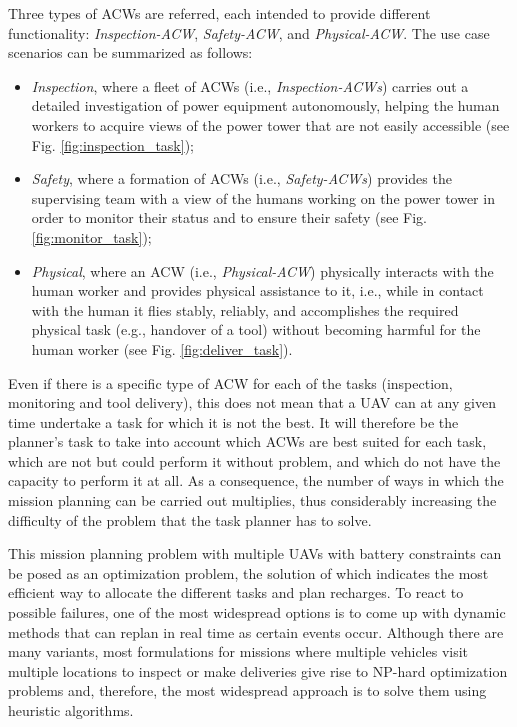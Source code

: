 Three types of \glspl{ACW} are referred, each intended to provide different functionality: \textit{Inspection-ACW}, \textit{Safety-ACW}, and \textit{Physical-ACW}. The use case scenarios can be summarized as follows: 

\begin{itemize}
    \item \textit{Inspection}, where a fleet of \glspl{ACW} (i.e., \textit{Inspection-ACWs}) carries out a detailed investigation of power equipment autonomously, helping the human workers to acquire views of the power tower that are not easily accessible (see Fig. \ref{fig:inspection_task});
    \item \textit{Safety}, where a formation of \glspl{ACW} (i.e., \textit{Safety-ACWs}) provides the supervising team with a view of the humans working on the power tower in order to monitor their status and to ensure their safety (see Fig. \ref{fig:monitor_task});
    \item \textit{Physical}, where an \gls{ACW} (i.e., \textit{Physical-ACW}) physically interacts with the human worker and provides physical assistance to it, i.e., while in contact with the human it flies stably, reliably, and accomplishes the required physical task (e.g., handover of a tool) without becoming harmful for the human worker (see Fig. \ref{fig:deliver_task}).
\end{itemize} 

Even if there is a specific type of \gls{ACW} for each of the tasks (inspection, monitoring and tool delivery), this does not mean that a \gls{UAV} can at any given time undertake a task for which it is not the best. It will therefore be the planner's task to take into account which \glspl{ACW} are best suited for each task, which are not but could perform it without problem, and which do not have the capacity to perform it at all. As a consequence, the number of ways in which the mission planning can be carried out multiplies, thus considerably increasing the difficulty of the problem that the task planner has to solve.

This mission planning problem with multiple \glspl{UAV} with battery constraints can be posed as an optimization problem, the solution of which indicates the most efficient way to allocate the different tasks and plan recharges. To react to possible failures, one of the most widespread options is to come up with dynamic methods that can replan in real time as certain events occur. Although there are many variants, most formulations for missions where multiple vehicles visit multiple locations to inspect or make deliveries give rise to NP-hard optimization problems and, therefore, the most widespread approach is to solve them using heuristic algorithms.

